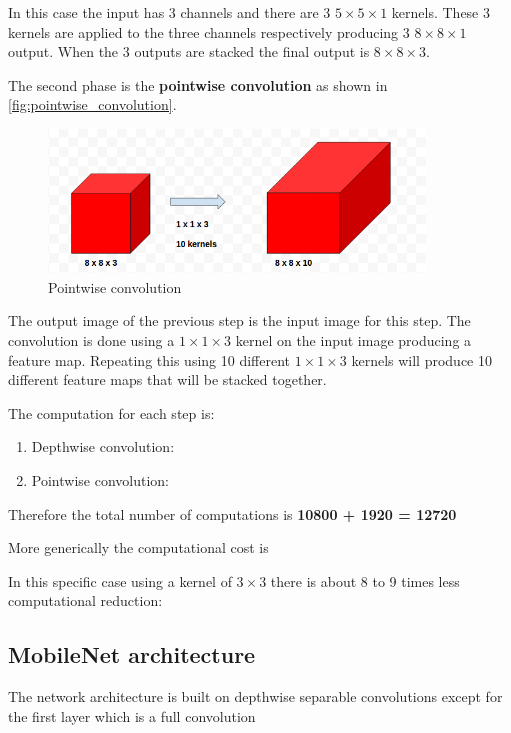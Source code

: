 In this case the input has 3 channels and there are 3 $5\times5\times1$
kernels. These 3 kernels are applied to the three channels respectively
producing 3 $8\times8\times1$ output. When the 3 outputs are stacked the final
output is $8\times8\times3$.

The second phase is the \textbf{pointwise convolution} as shown in
\autoref{fig:pointwise_convolution}.

\begin{figure}[ht]
    \includegraphics[width=10cm]{images/results/pointwise_convolution.png}
    \centering
    \caption{Pointwise convolution}\label{fig:pointwise_convolution}
\end{figure}

The output image of the previous step is the input image for this step.
The convolution is done using a $1\times1\times3$ kernel on the input image
producing a feature map. Repeating this using 10 different $1\times1\times3$
kernels will produce 10 different feature maps that will be stacked together.

The computation for each step is:
\begin{enumerate}
    \item Depthwise convolution: 
    \item Pointwise convolution: 
\end{enumerate}

Therefore the total number of computations is \textbf{10800 + 1920 = 12720}

More generically the computational cost is 

In this specific case using a kernel of $3 \times 3$ there is about 8 to 9
times less computational reduction: 

\subsection{MobileNet architecture}
The network architecture is built on depthwise separable convolutions except
for the first layer which is a full convolution

